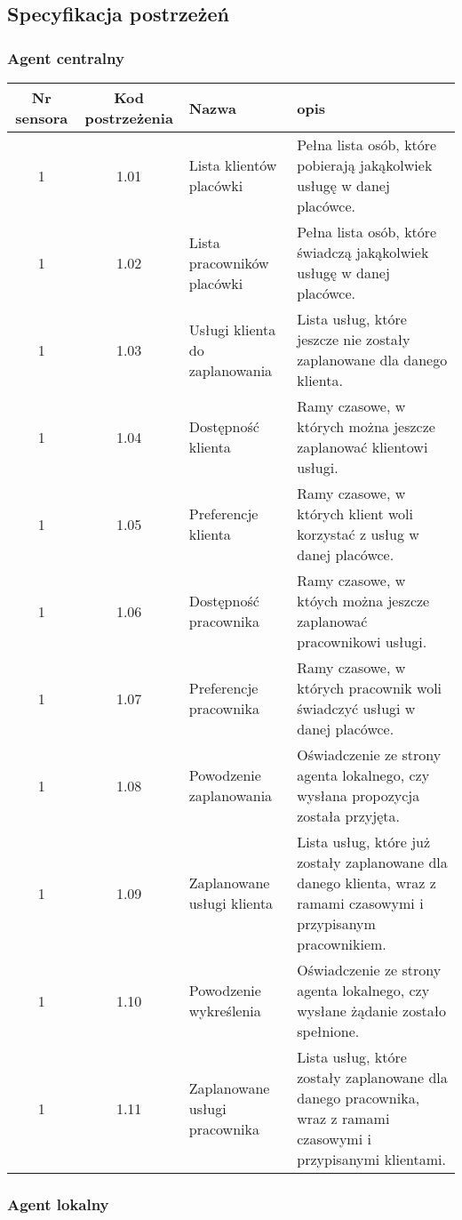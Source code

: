 \subsection{Specyfikacja postrzeżeń}

\subsubsection{Agent centralny}

\begin{tabular}{c|c|p{3cm}|p{5cm}}
Nr sensora & Kod postrzeżenia & Nazwa & opis\\
\hline
1 & 1.01 & Lista klientów placówki & Pełna lista osób, które pobierają jakąkolwiek usługę w danej placówce.\\
1 & 1.02 & Lista pracowników placówki & Pełna lista osób, które świadczą jakąkolwiek usługę w danej placówce.\\
1 & 1.03 & Usługi klienta do zaplanowania & Lista usług, które jeszcze nie zostały zaplanowane dla danego klienta.\\
1 & 1.04 & Dostępność klienta & Ramy czasowe, w których można jeszcze zaplanować klientowi usługi.\\
1 & 1.05 & Preferencje klienta & Ramy czasowe, w których klient woli korzystać z usług w danej placówce.\\
1 & 1.06 & Dostępność pracownika & Ramy czasowe, w któych można jeszcze zaplanować pracownikowi usługi.\\
1 & 1.07 & Preferencje pracownika & Ramy czasowe, w których pracownik woli świadczyć usługi w danej placówce.\\
1 & 1.08 & Powodzenie zaplanowania & Oświadczenie ze strony agenta lokalnego, czy wysłana propozycja została przyjęta. \\
1 & 1.09 & Zaplanowane usługi klienta & Lista usług, które już zostały zaplanowane dla danego klienta, wraz z ramami czasowymi i przypisanym pracownikiem. \\
1 & 1.10 & Powodzenie wykreślenia & Oświadczenie ze strony agenta lokalnego, czy wysłane żądanie zostało spełnione. \\
1 & 1.11 & Zaplanowane usługi pracownika & Lista usług, które zostały zaplanowane dla danego pracownika, wraz z ramami czasowymi i przypisanymi klientami.\\
\end{tabular}


\subsubsection{Agent lokalny}

